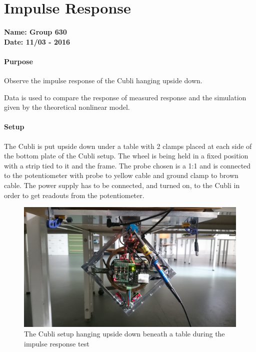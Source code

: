 \chapter{Impulse Response}\label{impulseTestAppendix} 
\textbf{Name: Group 630}\\
\textbf{Date: 11/03 - 2016}

\subsubsection{Purpose}
Observe the impulse response of the Cubli hanging upside down.

Data is used to compare the response of measured response and the simulation given by the theoretical nonlinear model.

\subsubsection{Setup}
The Cubli is put upside down under a table with 2 clamps placed at each side of the bottom plate of the Cubli setup.
The wheel is being held in a fixed position with a strip tied to it and the frame. The probe chosen is a 1:1 and is connected to the potentiometer with probe to yellow cable and ground clamp to brown cable. The power supply has to be connected, and turned on, to the Cubli in order to get readouts from the potentiometer.
\begin{figure}[H] 
	\centering 
	\includegraphics[scale=0.08]{figures/impulseResponseSetup}
	\caption{The Cubli setup hanging upside down beneath a table during the impulse response test}
	\label{impulseResponseTestPicture}
\end{figure} 

